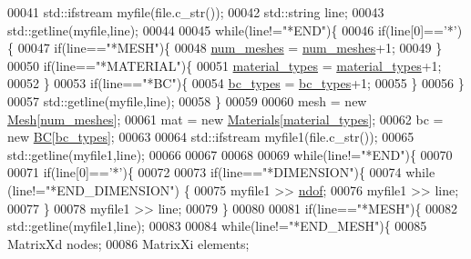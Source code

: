 \begin{DoxyCode}
00041   std::ifstream myfile(file.c\_str());
00042   std::string line;
00043   std::getline(myfile,line);
00044 
00045   \textcolor{keywordflow}{while}(line!=\textcolor{stringliteral}{"*END"})\{
00046     \textcolor{keywordflow}{if}(line[0]==\textcolor{charliteral}{'*'})\{
00047         \textcolor{keywordflow}{if}(line==\textcolor{stringliteral}{"*MESH"})\{
00048           \hyperlink{fe__main_read_8cpp_a509bc84434af1eff0173e4a71bd758ac}{num\_meshes} = \hyperlink{fe__main_read_8cpp_a509bc84434af1eff0173e4a71bd758ac}{num\_meshes}+1;
00049         \}
00050         \textcolor{keywordflow}{if}(line==\textcolor{stringliteral}{"*MATERIAL"})\{
00051           \hyperlink{fe__main_read_8cpp_a39328cf72d69139b3b6c5b8ef6c636fe}{material\_types} = \hyperlink{fe__main_read_8cpp_a39328cf72d69139b3b6c5b8ef6c636fe}{material\_types}+1;
00052         \}
00053         \textcolor{keywordflow}{if}(line==\textcolor{stringliteral}{"*BC"})\{
00054           \hyperlink{fe__main_read_8cpp_aad28f3904552ac6aa1642c44f0bc04e7}{bc\_types} = \hyperlink{fe__main_read_8cpp_aad28f3904552ac6aa1642c44f0bc04e7}{bc\_types}+1;
00055         \}
00056     \}
00057     std::getline(myfile,line);
00058   \}
00059 
00060   mesh = \textcolor{keyword}{new} \hyperlink{class_mesh}{Mesh}[\hyperlink{fe__main_read_8cpp_a509bc84434af1eff0173e4a71bd758ac}{num\_meshes}];
00061   mat = \textcolor{keyword}{new} \hyperlink{class_materials}{Materials}[\hyperlink{fe__main_read_8cpp_a39328cf72d69139b3b6c5b8ef6c636fe}{material\_types}];
00062   bc = \textcolor{keyword}{new} \hyperlink{class_b_c}{BC}[\hyperlink{fe__main_read_8cpp_aad28f3904552ac6aa1642c44f0bc04e7}{bc\_types}];
00063 
00064   std::ifstream myfile1(file.c\_str());
00065   std::getline(myfile1,line);
00066 
00067 
00068 
00069   \textcolor{keywordflow}{while}(line!=\textcolor{stringliteral}{"*END"})\{
00070 
00071     \textcolor{keywordflow}{if}(line[0]==\textcolor{charliteral}{'*'})\{
00072 
00073         \textcolor{keywordflow}{if}(line==\textcolor{stringliteral}{"*DIMENSION"})\{
00074           \textcolor{keywordflow}{while} (line!=\textcolor{stringliteral}{"*END\_DIMENSION"}) \{
00075             myfile1 >> \hyperlink{fe__main_read_8cpp_aa789fe4d8a13fd0990b630909430d5d0}{ndof};
00076             myfile1 >> line;
00077           \}
00078           myfile1 >> line;
00079         \}
00080 
00081         \textcolor{keywordflow}{if}(line==\textcolor{stringliteral}{"*MESH"})\{
00082           std::getline(myfile1,line);
00083 
00084           \textcolor{keywordflow}{while}(line!=\textcolor{stringliteral}{"*END\_MESH"})\{
00085             MatrixXd nodes;
00086             MatrixXi elements;

\end{DoxyCode}
